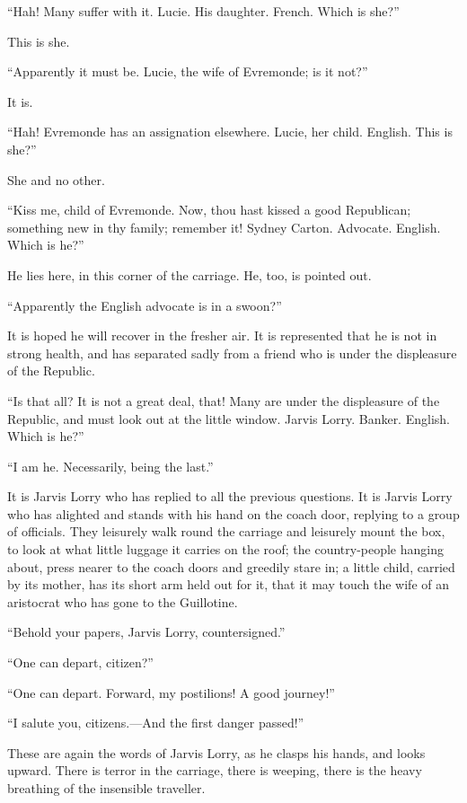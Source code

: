 ``Hah!  Many suffer with it.  Lucie.  His daughter.  French.  Which is she?''

This is she.

``Apparently it must be.  Lucie, the wife of Evremonde; is it not?''

It is.

``Hah!  Evremonde has an assignation elsewhere.  Lucie, her child.
English.  This is she?''

She and no other.

``Kiss me, child of Evremonde.  Now, thou hast kissed a good
Republican; something new in thy family; remember it!  Sydney Carton.
Advocate.  English. Which is he?''

He lies here, in this corner of the carriage.  He, too, is pointed out.

``Apparently the English advocate is in a swoon?''

It is hoped he will recover in the fresher air. It is represented
that he is not in strong health, and has separated sadly from a
friend who is under the displeasure of the Republic.

``Is that all?  It is not a great deal, that!  Many are under the
displeasure of the Republic, and must look out at the little window.
Jarvis Lorry. Banker.  English.  Which is he?''

``I am he.  Necessarily, being the last.''

It is Jarvis Lorry who has replied to all the previous questions.
It is Jarvis Lorry who has alighted and stands with his hand on the
coach door, replying to a group of officials.  They leisurely walk
round the carriage and leisurely mount the box, to look at what
little luggage it carries on the roof; the country-people hanging
about, press nearer to the coach doors and greedily stare in; a
little child, carried by its mother, has its short arm held out for
it, that it may touch the wife of an aristocrat who has gone to the
Guillotine.

``Behold your papers, Jarvis Lorry, countersigned.''

``One can depart, citizen?''

``One can depart.  Forward, my postilions!  A good journey!''

``I salute you, citizens.---And the first danger passed!''

These are again the words of Jarvis Lorry, as he clasps his hands,
and looks upward.  There is terror in the carriage, there is weeping,
there is the heavy breathing of the insensible traveller.

